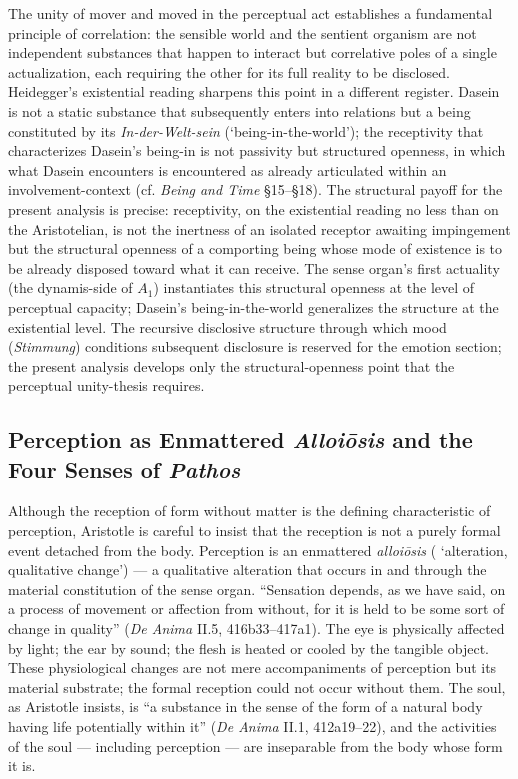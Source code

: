 The unity of mover and moved in the perceptual act establishes a fundamental principle of correlation: the sensible world and the sentient organism are not independent substances that happen to interact but correlative poles of a single actualization, each requiring the other for its full reality to be disclosed. Heidegger's existential reading sharpens this point in a different register. Dasein is not a static substance that subsequently enters into relations but a being constituted by its \textit{In-der-Welt-sein} (`being-in-the-world'); the receptivity that characterizes Dasein's being-in is not passivity but structured openness, in which what Dasein encounters is encountered as already articulated within an involvement-context (cf. \textit{Being and Time} \S 15--\S 18). The structural payoff for the present analysis is precise: receptivity, on the existential reading no less than on the Aristotelian, is not the inertness of an isolated receptor awaiting impingement but the structural openness of a comporting being whose mode of existence is to be already disposed toward what it can receive. The sense organ's first actuality (the dynamis-side of $A_1$) instantiates this structural openness at the level of perceptual capacity; Dasein's being-in-the-world generalizes the structure at the existential level. The recursive disclosive structure through which mood (\textit{Stimmung}) conditions subsequent disclosure is reserved for the emotion section; the present analysis develops only the structural-openness point that the perceptual unity-thesis requires.

\subsection{Perception as Enmattered \textit{Alloiōsis} and the Four Senses of \textit{Pathos}}

Although the reception of form without matter is the defining characteristic of perception, Aristotle is careful to insist that the reception is not a purely formal event detached from the body. Perception is an enmattered \textit{alloiōsis} ( `alteration, qualitative change') --- a qualitative alteration that occurs in and through the material constitution of the sense organ. ``Sensation depends, as we have said, on a process of movement or affection from without, for it is held to be some sort of change in quality'' (\textit{De Anima} II.5, 416b33--417a1). The eye is physically affected by light; the ear by sound; the flesh is heated or cooled by the tangible object. These physiological changes are not mere accompaniments of perception but its material substrate; the formal reception could not occur without them. The soul, as Aristotle insists, is ``a substance in the sense of the form of a natural body having life potentially within it'' (\textit{De Anima} II.1, 412a19--22), and the activities of the soul --- including perception --- are inseparable from the body whose form it is.

